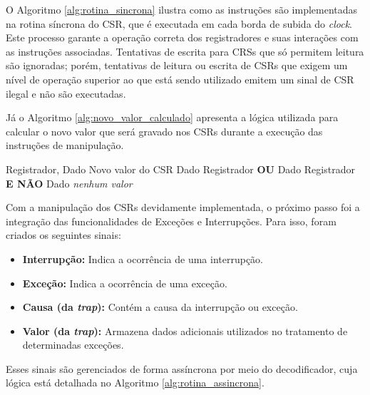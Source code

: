 \documentclass[
	12pt,				%
	openright,			%
	oneside,			%
	a4paper,			%
	english,			%
	french,				%
	spanish,			%
	brazil,				%
	]{abntex2}
\begin{document}
O Algoritmo \ref{alg:rotina_sincrona} ilustra como as instruções são implementadas na rotina síncrona do CSR, que é executada em cada borda de subida do \textit{clock}. Este processo garante a operação correta dos registradores e suas interações com as instruções associadas. Tentativas de escrita para CRSs que só permitem leitura são ignoradas; porém, tentativas de leitura ou escrita de CSRs que exigem um nível de operação superior ao que está sendo utilizado emitem um sinal de CSR ilegal e não são executadas.

Já o Algoritmo \ref{alg:novo_valor_calculado} apresenta a lógica utilizada para calcular o novo valor que será gravado nos CSRs durante a execução das instruções de manipulação.

\begin{algorithm}[H]
\caption{Função NovoValorCalculado()}
\label{alg:novo_valor_calculado}
\begin{algorithmic}[1]
    \REQUIRE Registrador, Dado
    \ENSURE Novo valor do CSR
        \RETURN Dado
        \RETURN Registrador \textbf{OU} Dado
        \RETURN Registrador \textbf{E NÃO} Dado
    \ELSE
        \RETURN \textit{nenhum valor}
    \ENDIF
\end{algorithmic}
\end{algorithm}

Com a manipulação dos CSRs devidamente implementada, o próximo passo foi a integração das funcionalidades de Exceções e Interrupções. Para isso, foram criados os seguintes sinais:

\begin{itemize}
    \item \textbf{Interrupção:} Indica a ocorrência de uma interrupção.
    \item \textbf{Exceção:} Indica a ocorrência de uma exceção.
    \item \textbf{Causa (da \textit{trap}):} Contém a causa da interrupção ou exceção.
    \item \textbf{Valor (da \textit{trap}):} Armazena dados adicionais utilizados no tratamento de determinadas exceções.
\end{itemize}

Esses sinais são gerenciados de forma assíncrona por meio do decodificador, cuja lógica está detalhada no Algoritmo \ref{alg:rotina_assincrona}.
\end{document}
